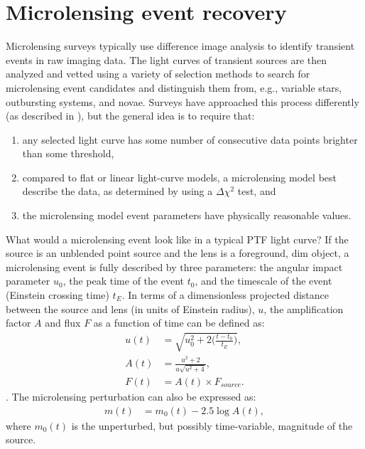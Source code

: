 \documentclass{emulateapj}
\begin{document}
\section{Microlensing event recovery} \label{sec:event_recovery}
Microlensing surveys typically use difference image analysis \citep{alard1998} to identify transient events in raw imaging data. The light curves of transient sources are then analyzed and vetted using a variety of selection methods to search for microlensing event candidates and distinguish them from, e.g., variable stars, outbursting systems, and novae. Surveys have approached this process differently (as described in \citealt{ogle_optical_depth, con_idx, alcock2000, macho_detection_efficiency, udalski03,  hamadache2009, wyrzykowski2009, sumi2011}), but the general idea is to require that: 
\begin{enumerate}
	\item any selected light curve has some number of consecutive data points brighter than some threshold,
	\item compared to flat or linear light-curve models, a microlensing model best describe the data, as determined by using a $\Delta\chi^2$ test, and
	\item the microlensing model event parameters have physically reasonable values.
\end{enumerate}

What would a microlensing event look like in a typical PTF light curve? If the source is an unblended point source and the lens is a foreground, dim object, a microlensing event is fully described by three parameters: the angular impact parameter $u_0$, the peak time of the event $t_0$, and the timescale of the event (Einstein crossing time) $t_E$. In terms of a dimensionless projected distance between the source and lens (in units of Einstein radius), $u$, the amplification factor $A$ and flux $F$ as a function of time can be defined as: 
\begin{align}
	u(t) &= \sqrt{u_0^2 + 2\Big(\frac{t-t_0}{t_E}\Big)},\\
	A(t) &= \frac{u^2 + 2}{u\sqrt{u^2 + 4}},\\
	F(t) &= A(t)\times F_{source}.
\end{align}
\citep{paczynski1986}. The microlensing perturbation can also be expressed as:
\begin{align}\label{eq:ml_model}
	m(t) &= m_0(t) - 2.5\log A(t),
\end{align}
where $m_0(t)$ is the unperturbed, but possibly time-variable, magnitude of the source.
\end{document}
